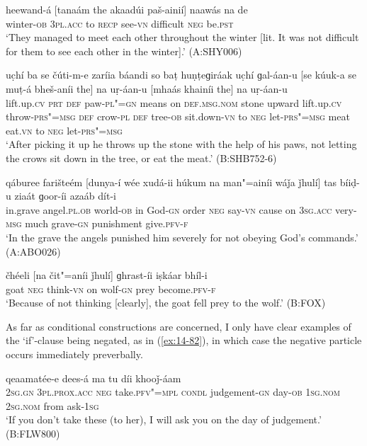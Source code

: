 \begin{exe}
\ex
\label{ex:14-78}
\gll heewand-á [tanaám the akaadúi paš-ainií] naawás  na de \\
winter-\textsc{ob} \textsc{3pl.acc} to \textsc{recp} see-\textsc{vn} difficult \textsc{neg}
be.\textsc{pst} \\
\glt `They managed to meet each other throughout the winter [lit. It was not difficult for them to see each other in the winter].' (A:SHY006)

\ex
\label{ex:14-79}
\gll uc̣hí ba se čúti-m-e zaríia báandi  so baṭ huṇṭeɡiráak uc̣hí
ɡal-áan-u  [se kúuk-a se muṭ-á bheš-aníi the] na uṛ-áan-u \textsc{[}mhaás khainíi the] na uṛ-áan-u \\
lift.up.\textsc{cv} \textsc{prt} \textsc{def} paw-\textsc{pl"=gn} means on  \textsc{def.msg.nom} stone upward lift.up.\textsc{cv} throw-\textsc{prs"=msg}  \textsc{def} crow-\textsc{pl} \textsc{def} tree-\textsc{ob} sit.down-\textsc{vn} to \textsc{neg} let-\textsc{prs"=msg} meat eat.\textsc{vn} to \textsc{neg} let-\textsc{prs"=msg} \\
\glt `After picking it up he throws up the stone with the help of his paws, not letting the crows sit down in the tree, or eat the meat.' (B:SHB752-6)

\ex
\label{ex:14-80}
\gll qáburee farišteém [dunya-í wée xudá-ii húkum na  man"=ainíi wáǰa
  ǰhulí] tas bíiḍ-u ziaát  ɡoor-íi azaáb dít-i \\
in.grave angel.\textsc{pl.ob} world-\textsc{ob} in God-\textsc{gn} order \textsc{neg}  say-\textsc{vn} cause on \textsc{3sg.acc} very-\textsc{msg} much grave-\textsc{gn} punishment give.\textsc{pfv-f}  \\
\glt `In the grave the angels punished him severely for not obeying God's commands.' (A:ABO026)

\ex
\label{ex:14-81}
\gll čhéeli [na čit"=aníi ǰhulí] ɡhrast-íi iṣkáar bhíl-i \\
goat \textsc{neg} think-\textsc{vn} on wolf-\textsc{gn} prey become.\textsc{pfv-f} \\
\glt `Because of not thinking [clearly], the goat fell prey to the wolf.' (B:FOX)
\end{exe}

As far as conditional constructions are concerned, I only have clear examples of the `if'-clause being negated, as in (\ref{ex:14-82}), in which case the negative particle occurs immediately preverbally.

\begin{exe}
\ex
\label{ex:14-82}
  qeaamatée-e dees-á ma tu díi khooǰ-áam \\
\textsc{2sg.gn} \textsc{3pl.prox.acc} \textsc{neg} take.\textsc{pfv"=mpl} \textsc{condl}  judgement-\textsc{gn} day-\textsc{ob} \textsc{1sg.nom} \textsc{2sg.nom} from ask-\textsc{1sg}  \\
\glt `If you don't take these (to her), I will ask you on the day of judgement.' (B:FLW800)
\end{exe}

